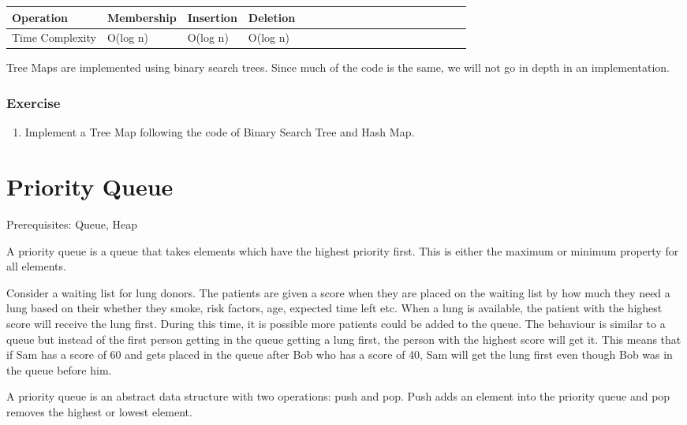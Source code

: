 \documentclass[11pt,oneside]{book}
\begin{document}
\vspace{10px}\begin{tabulary}{0.4\linewidth}{|l|l|l|l|l|l|l|l|l|l|l|l|l|l|l|l|l|l|l}\hline


  Operation &
  Membership &
  Insertion &
  Deletion\\
\hline


  Time Complexity &
  O(log n) &
  O(log n) &
  O(log n)\\

\hline\end{tabulary}

Tree Maps are implemented using binary search trees. Since much of the code is the same, we will not go in depth in an implementation.

\subsection{Exercise}

\begin{enumerate}
\item Implement a Tree Map following the code of Binary Search Tree and Hash Map.
\end{enumerate}

    \chapter{ Priority Queue }
        

Prerequisites: Queue, Heap

A priority queue is a queue that takes elements which have the highest priority first. This is either the maximum or minimum property for all elements.

Consider a waiting list for lung donors. The patients are given a score when they are placed on the waiting list by how much they need a lung based on their whether they smoke, risk factors, age, expected time left etc. When a lung is available, the patient with the highest score will receive the lung first. During this time, it is possible more patients could be added to the queue. The behaviour is similar to a queue but instead of the first person getting in the queue getting a lung first, the person with the highest score will get it. This means that if Sam has a score of 60 and gets placed in the queue after Bob who has a score of 40, Sam will get the lung first even though Bob was in the queue before him.

A priority queue is an abstract data structure with two operations: push and pop. Push adds an element into the priority queue and pop removes the highest or lowest element.
\end{document}
